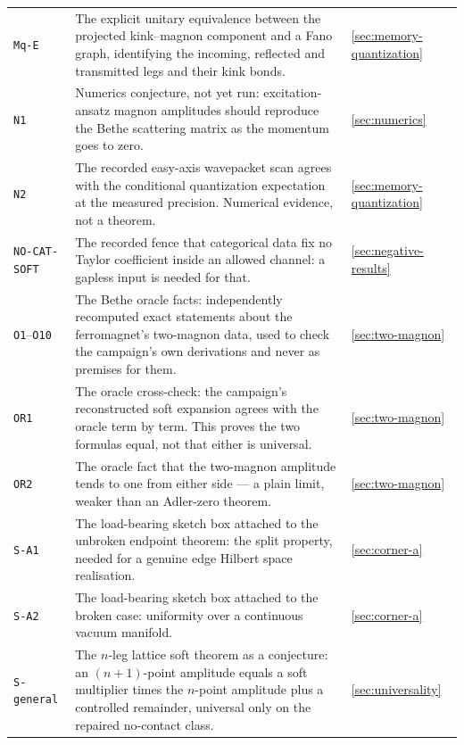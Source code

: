 {\begin{longtable}{@{}p{}p{}p{}@{}}
\texttt{Mq-E} & The explicit unitary equivalence between the projected
kink--magnon component and a Fano graph, identifying the incoming, reflected
and transmitted legs and their kink bonds. & \cref{sec:memory-quantization}\\

\texttt{N1} & Numerics conjecture, not yet run: excitation-ansatz magnon
amplitudes should reproduce the Bethe scattering matrix as the momentum goes
to zero. & \cref{sec:numerics}\\

\texttt{N2} & The recorded easy-axis wavepacket scan agrees with the
conditional quantization expectation at the measured precision. Numerical
evidence, not a theorem. & \cref{sec:memory-quantization}\\

\texttt{NO-CAT-SOFT} & The recorded fence that categorical data fix no Taylor
coefficient inside an allowed channel: a gapless input is needed for that. & \cref{sec:negative-results}\\

\texttt{O1}--\texttt{O10} & The Bethe oracle facts: independently recomputed
exact statements about the ferromagnet's two-magnon data, used to check the
campaign's own derivations and never as premises for them. & \cref{sec:two-magnon}\\

\texttt{OR1} & The oracle cross-check: the campaign's reconstructed soft
expansion agrees with the oracle term by term. This proves the two formulas
equal, not that either is universal. & \cref{sec:two-magnon}\\

\texttt{OR2} & The oracle fact that the two-magnon amplitude tends to one from
either side --- a plain limit, weaker than an Adler-zero theorem. & \cref{sec:two-magnon}\\

\texttt{S-A1} & The load-bearing sketch box attached to the unbroken endpoint
theorem: the split property, needed for a genuine edge Hilbert space
realisation. & \cref{sec:corner-a}\\

\texttt{S-A2} & The load-bearing sketch box attached to the broken case:
uniformity over a continuous vacuum manifold. & \cref{sec:corner-a}\\

\texttt{S-general} & The $n$-leg lattice soft theorem as a conjecture: an
$(n{+}1)$-point amplitude equals a soft multiplier times the $n$-point
amplitude plus a controlled remainder, universal only on the repaired
no-contact class. & \cref{sec:universality}\\


\end{longtable}}
